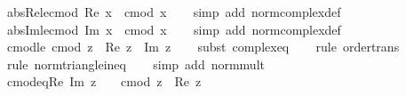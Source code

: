 \begin{isabellebody}
\endisatagproof
{\isafoldproof}%
%
\isadelimproof
\isanewline
%
\endisadelimproof
\isanewline
{}\isamarkupfalse%
\ abs{\isacharunderscore}{\kern0pt}Re{\isacharunderscore}{\kern0pt}le{\isacharunderscore}{\kern0pt}cmod{\isacharcolon}{\kern0pt}\ {\isachardoublequoteopen}{\isasymbar}Re\ x{\isasymbar}\ {\isasymle}\ cmod\ x{\isachardoublequoteclose}\isanewline
%
\isadelimproof
\ \ %
\endisadelimproof
%
\isatagproof
{}\isamarkupfalse%
\ {\isacharparenleft}{\kern0pt}simp\ add{\isacharcolon}{\kern0pt}\ norm{\isacharunderscore}{\kern0pt}complex{\isacharunderscore}{\kern0pt}def{\isacharparenright}{\kern0pt}%
\endisatagproof
{\isafoldproof}%
%
\isadelimproof
\isanewline
%
\endisadelimproof
\isanewline
{}\isamarkupfalse%
\ abs{\isacharunderscore}{\kern0pt}Im{\isacharunderscore}{\kern0pt}le{\isacharunderscore}{\kern0pt}cmod{\isacharcolon}{\kern0pt}\ {\isachardoublequoteopen}{\isasymbar}Im\ x{\isasymbar}\ {\isasymle}\ cmod\ x{\isachardoublequoteclose}\isanewline
%
\isadelimproof
\ \ %
\endisadelimproof
%
\isatagproof
{}\isamarkupfalse%
\ {\isacharparenleft}{\kern0pt}simp\ add{\isacharcolon}{\kern0pt}\ norm{\isacharunderscore}{\kern0pt}complex{\isacharunderscore}{\kern0pt}def{\isacharparenright}{\kern0pt}%
\endisatagproof
{\isafoldproof}%
%
\isadelimproof
\isanewline
%
\endisadelimproof
\isanewline
{}\isamarkupfalse%
\ cmod{\isacharunderscore}{\kern0pt}le{\isacharcolon}{\kern0pt}\ {\isachardoublequoteopen}cmod\ z\ {\isasymle}\ {\isasymbar}Re\ z{\isasymbar}\ {\isacharplus}{\kern0pt}\ {\isasymbar}Im\ z{\isasymbar}{\isachardoublequoteclose}\isanewline
%
\isadelimproof
\ \ %
\endisadelimproof
%
\isatagproof
{}\isamarkupfalse%
\ {\isacharparenleft}{\kern0pt}subst\ complex{\isacharunderscore}{\kern0pt}eq{\isacharparenright}{\kern0pt}\isanewline
\ \ \isamarkupfalse%
\ {\isacharparenleft}{\kern0pt}rule\ order{\isacharunderscore}{\kern0pt}trans{\isacharparenright}{\kern0pt}\isanewline
\ \ \ \isamarkupfalse%
\ {\isacharparenleft}{\kern0pt}rule\ norm{\isacharunderscore}{\kern0pt}triangle{\isacharunderscore}{\kern0pt}ineq{\isacharparenright}{\kern0pt}\isanewline
\ \ \isamarkupfalse%
\ {\isacharparenleft}{\kern0pt}simp\ add{\isacharcolon}{\kern0pt}\ norm{\isacharunderscore}{\kern0pt}mult{\isacharparenright}{\kern0pt}\isanewline
\ \ \isamarkupfalse%
%
\endisatagproof
{\isafoldproof}%
%
\isadelimproof
\isanewline
%
\endisadelimproof
\isanewline
{}\isamarkupfalse%
\ cmod{\isacharunderscore}{\kern0pt}eq{\isacharunderscore}{\kern0pt}Re{\isacharcolon}{\kern0pt}\ {\isachardoublequoteopen}Im\ z\ {\isacharequal}{\kern0pt}\ {}\ {\isasymLongrightarrow}\ cmod\ z\ {\isacharequal}{\kern0pt}\ {\isasymbar}Re\ z{\isasymbar}{\isachardoublequoteclose}\isanewline

\end{isabellebody}
